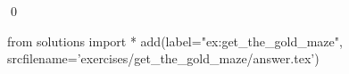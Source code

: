
\begin{ex} 
  \label{ex:get_the_gold_maze}
  
  \qed
\end{ex} 
\begin{python0}
from solutions import *
add(label="ex:get_the_gold_maze",
    srcfilename='exercises/get_the_gold_maze/answer.tex') 
\end{python0}
